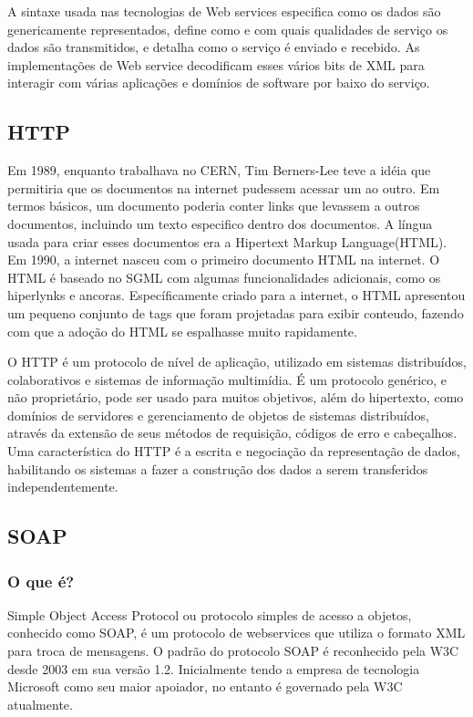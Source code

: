 \documentclass{acm_proc_article-sp}
\begin{document}
		A sintaxe usada nas tecnologias de Web services especifica como os dados são genericamente representados, define como e com quais qualidades de serviço os dados são transmitidos, e detalha como o serviço é enviado e recebido. As implementações de Web service decodificam esses vários bits de XML para interagir com várias aplicações e domínios de software por baixo do serviço.\cite{UNDERWEBSERVICES}
		
		
	\subsection{HTTP}
		Em 1989, enquanto trabalhava no CERN, Tim Berners-Lee teve a idéia que permitiria que os documentos na 
		internet pudessem acessar um ao outro. Em termos básicos, um documento poderia conter links que
		levassem a outros documentos, incluindo um texto especifico dentro dos documentos. A língua usada
		para criar esses documentos era a Hipertext Markup Language(HTML). Em 1990, a internet nasceu com
		o primeiro documento HTML na internet. O HTML é baseado no SGML com algumas funcionalidades adicionais, como os hiperlynks
		e ancoras. Específicamente criado para a internet, o HTML apresentou um pequeno conjunto de tags que foram projetadas
		para exibir conteudo, fazendo com que a adoção do HTML se espalhasse muito rapidamente.\cite{PRO_PHPXML}
	
		O HTTP é um protocolo de nível de aplicação, utilizado em sistemas distribuídos, colaborativos e sistemas de informação multimídia. É um protocolo genérico, e não proprietário, pode ser usado para muitos objetivos, além do hipertexto, como domínios de servidores e gerenciamento de objetos de sistemas distribuídos, através da extensão de seus métodos de requisição, códigos de erro e cabeçalhos. Uma característica do HTTP é a escrita e negociação da representação de dados, habilitando os sistemas a fazer a construção dos dados a serem transferidos independentemente.\cite{HTTP-1.1}
	

		
		
		
	\subsection{SOAP}
	
		\subsubsection{O que é?}
	
			Simple Object Access Protocol ou protocolo simples de acesso a objetos, conhecido como SOAP, é um protocolo de webservices que utiliza o formato XML para troca de mensagens. O padrão do protocolo SOAP é reconhecido pela W3C desde 2003 em sua versão 1.2. Inicialmente tendo a empresa de tecnologia Microsoft como seu maior apoiador, no entanto é governado pela W3C atualmente.
		
\end{document}
